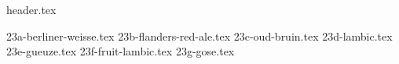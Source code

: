 \clearpage
{}
\divisorLine

{header.tex}

\begin{multicols}{2}

{23a-berliner-weisse.tex}
{23b-flanders-red-ale.tex}
{23c-oud-bruin.tex}
{23d-lambic.tex}
{23e-gueuze.tex}
{23f-fruit-lambic.tex}
{23g-gose.tex}

\end{multicols}
